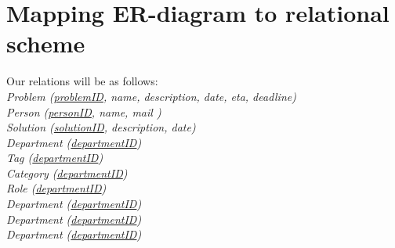 \section{Mapping ER-diagram to relational scheme}
\label{sec:map_er_rel}

Our relations will be as follows:\\

\textit{Problem (\underline{problemID}, name, description, date, eta, deadline)} \\



\textit{Person (\underline{personID}, name, mail )} \\
\textit{Solution (\underline{solutionID}, description, date)} \\
\textit{Department (\underline{departmentID})} \\
\textit{Tag (\underline{departmentID})} \\
\textit{Category (\underline{departmentID})} \\
\textit{Role (\underline{departmentID})} \\
\textit{Department (\underline{departmentID})} \\
\textit{Department (\underline{departmentID})} \\
\textit{Department (\underline{departmentID})} \\



